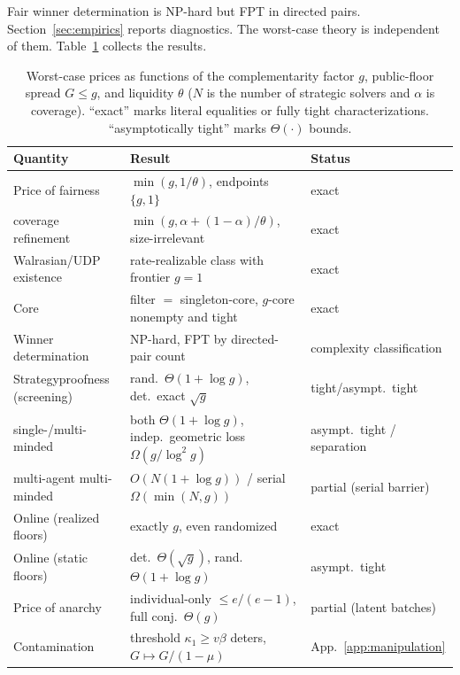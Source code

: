 \documentclass{llncs}
\begin{document}
Fair winner determination is NP-hard but FPT in directed pairs.
Section~\ref{sec:empirics} reports diagnostics. The worst-case theory is
independent of them. Table~\ref{tab:summary} collects the results.

\begin{table}[t]
\centering
\caption{Worst-case prices as functions of the complementarity factor
$g$, public-floor spread $G\le g$, and liquidity $\theta$ ($N$ is the
number of strategic solvers and $\alpha$ is coverage). ``exact'' marks literal equalities or fully tight
characterizations. ``asymptotically tight'' marks $\Theta(\cdot)$
bounds.}
\label{tab:summary}
\footnotesize
\setlength{\tabcolsep}{2pt}
\begin{tabular}{@{}>{\raggedright\arraybackslash}p{}
                  >{\raggedright\arraybackslash}p{}
                  >{\raggedright\arraybackslash}p{}@{}}
\toprule
Quantity & Result & Status\\
\midrule
Price of fairness & $\min(g,1/\theta)$, endpoints $\{g,1\}$ & exact\\
\quad coverage refinement & $\min(g,\alpha+(1-\alpha)/\theta)$, size-irrelevant & exact\\
Walrasian/UDP existence & rate-realizable class with frontier $g=1$ & exact\\
Core & filter $=$ singleton-core, $g$-core nonempty and tight & exact\\
Winner determination & NP-hard, FPT by directed-pair count & complexity classification\\
Strategyproofness (screening) & rand.\ $\Theta(1+\log g)$, det.\ exact $\sqrt g$ & tight/asympt.\ tight\\
\quad single-/multi-minded & both $\Theta(1+\log g)$, indep.\ geometric loss $\Omega(g/\log^2 g)$ & asympt.\ tight / separation\\
\quad multi-agent multi-minded & $O(N(1+\log g))$ / serial $\Omega(\min(N,g))$ & partial (serial barrier)\\
Online (realized floors) & exactly $g$, even randomized & exact\\
Online (static floors) & det.\ $\Theta(\sqrt g)$, rand.\ $\Theta(1+\log g)$ & asympt.\ tight\\
Price of anarchy & individual-only $\le e/(e-1)$, full conj.\ $\Theta(g)$ & partial (latent batches)\\
Contamination & threshold $\kappa_1\ge v\beta$ deters, $G\mapsto G/(1-\mu)$ & App.~\ref{app:manipulation}\\
\bottomrule
\end{tabular}
\end{table}
\end{document}
